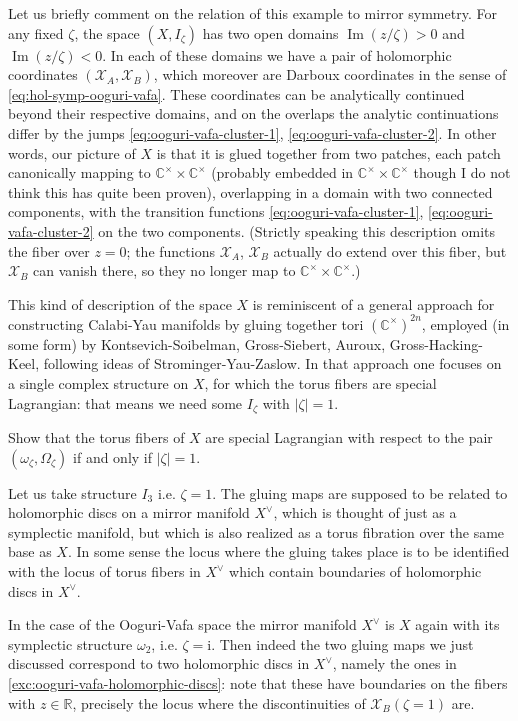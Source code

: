 \documentclass[12pt,letterpaper,reqno]{article}
\numberwithin{equation}{section}
\newcommand{\cX}{\ensuremath{\mathcal X}}
\newcommand{\R}{\ensuremath{\mathbb R}}
\newcommand{\C}{\ensuremath{\mathbb C}}
\newcommand{\I}{{\mathrm i}}
\newcommand{\abs}[1]{\lvert#1\rvert}
\DeclareMathOperator{\im}{Im}
\begin{document}
Let us briefly comment on the relation of this example to mirror symmetry.
For any fixed $\zeta$, the space $(X,I_\zeta)$
has two open domains $\im(z / \zeta) > 0$ and $\im(z / \zeta) < 0$.
In each of these domains
we have a pair of holomorphic coordinates $(\cX_A, \cX_B)$, which moreover
are Darboux coordinates in the sense of \eqref{eq:hol-symp-ooguri-vafa}.
These coordinates can be analytically continued beyond their respective
domains, and on the overlaps the analytic continuations differ by the
jumps \eqref{eq:ooguri-vafa-cluster-1}, \eqref{eq:ooguri-vafa-cluster-2}.
In other words, our picture of $X$ is that it is glued together from
two patches, each patch
canonically mapping to $\C^\times \times \C^\times$
(probably embedded in $\C^\times \times \C^\times$ though I do not
think this has quite been proven),
overlapping in a domain with two connected components,
with the transition functions
\eqref{eq:ooguri-vafa-cluster-1}, \eqref{eq:ooguri-vafa-cluster-2}
on the two components.
(Strictly speaking this description omits the fiber over $z = 0$;
the functions $\cX_A$, $\cX_B$ actually do extend over
this fiber, but $\cX_B$ can vanish there, so they no longer map
to $\C^\times \times \C^\times$.)

This kind of description of the space $X$ is reminiscent of a general
approach for constructing Calabi-Yau manifolds by gluing
together tori $(\C^\times)^{2n}$, employed (in some form) by
Kontsevich-Soibelman, Gross-Siebert, Auroux, Gross-Hacking-Keel, following
ideas of Strominger-Yau-Zaslow.
In that approach one focuses on a single complex structure on $X$,
for which  the torus fibers are special Lagrangian: that means
we need some $I_\zeta$ with $\abs{\zeta} = 1$.

\begin{exercise} Show that the torus fibers of $X$ are special
Lagrangian with respect to the pair $(\omega_\zeta, \Omega_\zeta)$
if and only if $\abs{\zeta} = 1$.
\end{exercise}

Let us take structure $I_3$ i.e.
$\zeta = 1$. The gluing maps are supposed to be related to
holomorphic discs on a mirror manifold $X^\vee$, which is thought of
just as a symplectic manifold, but which is also
realized as a torus fibration over the same base as $X$. In some sense
the locus where the gluing takes place is to be identified with the
locus of torus fibers in $X^\vee$
which contain boundaries of holomorphic
discs in $X^\vee$.

In the case of the Ooguri-Vafa space
the mirror manifold $X^\vee$ is $X$ again with
its symplectic structure $\omega_2$, i.e. $\zeta = \I$.
Then indeed the two gluing maps we just discussed correspond to two
holomorphic discs in $X^\vee$, namely the ones
in \autoref{exc:ooguri-vafa-holomorphic-discs}:
note that these have boundaries on the fibers with $z \in \R$,
precisely the locus where the discontinuities of $\cX_B(\zeta = 1)$ are.
\end{document}
